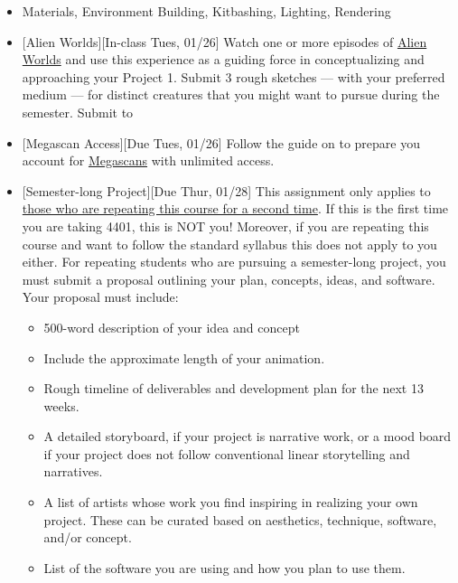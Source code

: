 \def\dMon{Mon, 01/25}
\def\dTues{Tues, 01/26}
\def\dWed{Wed, 01/27}
\def\dThur{Thur, 01/28}
\def\dFri{Fri, 01/29}
\def\dSat{Sat, 01/30}
\def\dSun{Sun, 01/31}
\placeDate

\begin{itemize}[noitemsep,topsep=0pt,leftmargin=*]
    \item {} Materials, Environment Building, Kitbashing, Lighting, Rendering
    \item {}[Alien Worlds][In-class \dTues] \newline Watch one or more episodes of \href{https://www.netflix.com/title/80221410}{Alien Worlds} and use this experience as a guiding force in conceptualizing and approaching your Project 1. Submit 3 rough sketches --- with your preferred medium --- for distinct creatures that you might want to pursue during the semester. Submit to 
    \item {}[Megascan Access][Due \dTues] Follow the guide on  to prepare you account for \href{https://quixel.com/megascans}{Megascans} with unlimited access.
    \item {}[Semester-long Project][Due \dThur] This assignment only applies to \ul{those who are repeating this course for a second time}. If this is the first time you are taking 4401, this is NOT you! Moreover, if you are repeating this course and want to follow the standard syllabus this does not apply to you either. For repeating students who are pursuing a semester-long project, you must submit a proposal outlining your plan, concepts, ideas, and software. Your proposal must include:
          \begin{itemize}
              \item 500-word description of your idea and concept
              \item Include the approximate length of your animation.
              \item Rough timeline of deliverables and development plan for the next 13 weeks.
              \item A detailed storyboard, if your project is narrative work, or a mood board if your project does not follow conventional linear storytelling and narratives.
              \item A list of artists whose work you find inspiring in realizing your own project. These can be curated based on aesthetics, technique, software, and/or concept.
              \item List of the software you are using and how you plan to use them.

\end{itemize}
\end{itemize}
